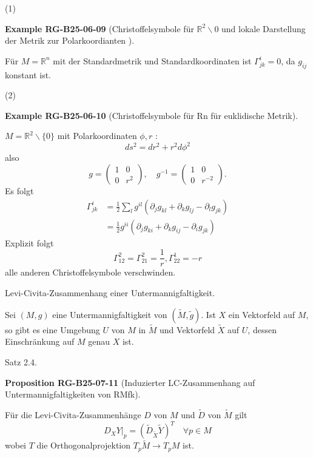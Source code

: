 \documentclass[10pt, letterpaper]{article}
\newcommand{\R}{\mathbb{R}}
\newcommand{\CustomHeading}[3]{%
  \par\medskip\noindent%
  \textbf{#1 #2} \textnormal{(#3)}.\enskip%
}
\newenvironment{PROP}[2]{\begin{unitbox}\CustomHeading{Proposition}{#1}{#2}}{\end{unitbox}}
\newenvironment{EXA}[2]{\begin{unitbox}\CustomHeading{Example}{#1}{#2}}{\end{unitbox}}
\begin{document}
(1) 


\begin{EXA}{RG-B25-06-09}{Christoffelsymbole für $\R^2\backslash 0$ und lokale Darstellung der Metrik zur Polarkoordianten }
Für $M=\mathbb{R}^{n}$ mit der Standardmetrik und Standardkoordinaten ist $\Gamma_{j k}^{i}=0$, da $g_{i j}$ konstant ist.
\end{EXA}


(2) 

\begin{EXA}{RG-B25-06-10}{Christoffelsymbole für Rn für euklidische Metrik}
$M=\mathbb{R}^{2} \backslash\{0\}$ mit Polarkoordinaten $\phi, r$ :
$$
d s^{2}=d r^{2}+r^{2} d \phi^{2}
$$
also
$$
g=\left(\begin{array}{cc}
1 & 0 \\
0 & r^{2}
\end{array}\right), \quad g^{-1}=\left(\begin{array}{cc}
1 & 0 \\
0 & r^{-2}
\end{array}\right) .
$$
Es folgt
$$
\begin{aligned}
\Gamma_{j k}^{i} & =\frac{1}{2} \sum_{l} g^{i l}\left(\partial_{j} g_{k l}+\partial_{k} g_{l j}-\partial_{l} g_{j k}\right) \\
& =\frac{1}{2} g^{i i}\left(\partial_{j} g_{k i}+\partial_{k} g_{i j}-\partial_{i} g_{j k}\right)
\end{aligned}
$$
Explizit folgt
$$
\Gamma_{12}^{2}=\Gamma_{21}^{2}=\frac{1}{r}, \Gamma_{22}^{1}=-r
$$
alle anderen Christoffelsymbole verschwinden.
\end{EXA}




Levi-Civita-Zusammenhang einer Untermannigfaltigkeit. 

Sei $(M, g)$ eine Untermannigfaltigkeit von $(\tilde{M}, \tilde{g})$. Ist $X$ ein Vektorfeld auf $M$, so gibt es eine Umgebung $U$ von $M$ in $\tilde{M}$ und Vektorfeld $\tilde{X}$ auf $U$, dessen Einschränkung auf $M$ genau $X$ ist.



Satz 2.4. 


\begin{PROP}{RG-B25-07-11}{Induzierter LC-Zusammenhang auf Untermannigfaltigkeiten von RMfk}
Für die Levi-Civita-Zusammenhänge $D$ von $M$ und $\tilde{D}$ von $\tilde{M}$ gilt
\begin{equation*}
\left.D_{X} Y\right|_{p}=\left(\tilde{D}_{\tilde{X}} \tilde{Y}\right)^{T} \quad \forall p \in M \tag{1}
\end{equation*}
wobei $T$ die Orthogonalprojektion $T_{p} \tilde{M} \rightarrow T_{p} M$ ist.
\end{PROP}
\end{document}

